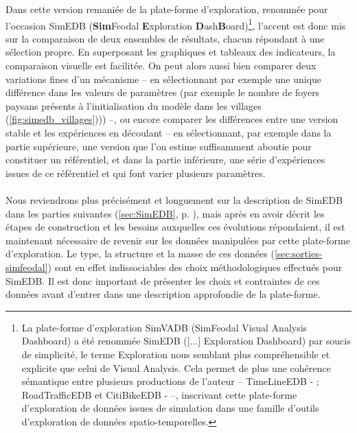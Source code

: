 	Dans cette version remaniée de la plate-forme d'exploration, renommée pour l'occasion SimEDB\label{par:introduction-nom-simedb} (\textbf{Sim}Feodal \textbf{E}xploration \textbf{D}ash\textbf{B}oard)\footnote{\label{ftn:origine-simedb}
		La plate-forme d'exploration SimVADB (SimFeodal Visual Analysis Dashboard) a été renommée SimEDB ([...] Exploration Dashboard) par soucis de simplicité, le terme \og Exploration\fg{} nous semblant plus compréhensible et explicite que celui de Visual Analysis. Cela permet de plus une cohérence sémantique entre plusieurs productions de l'auteur -- TimeLineEDB - \autocite{cura_timelineedb_2017}; RoadTrafficEDB et CitiBikeEDB - \autocite{cura_making_2017} --, inscrivant cette plate-forme d'exploration de données issues de simulation dans une \og famille \fg{} d'outils d'exploration de données spatio-temporelles.
	}, l'accent est donc mis sur la comparaison de deux ensembles de résultats, chacun répondant à une sélection propre.
	En superposant les graphiques et tableaux des indicateurs, la comparaison visuelle est facilitée.
	On peut alors aussi bien comparer deux variations fines d'un mécanisme -- en sélectionnant par exemple une unique différence dans les valeurs de paramètres (par exemple le nombre de foyers paysans présents à l'initialisation du modèle dans les villages (\cref{fig:simedb_villages}))) --, ou encore comparer les différences entre une version stable et les expériences en découlant -- en sélectionnant, par exemple dans la partie supérieure, une version que l'on estime suffisamment aboutie pour constituer un référentiel, et dans la partie inférieure, une série d'expériences issues de ce référentiel et qui font varier plusieurs paramètres.


	\paragraph*{}
	Nous reviendrons plus précisément et longuement sur la description de SimEDB dans les parties suivantes (\cref{sec:SimEDB}, p. \pageref{sec:SimEDB}), mais après en avoir décrit les étapes de construction et les besoins auxquelles ces évolutions répondaient, il est maintenant nécessaire de revenir sur les données manipulées par cette plate-forme d'exploration.
	Le type, la structure et la masse de ces données (\cref{sec:sorties-simfeodal}) sont en effet indissociables des choix méthodologiques effectués pour SimEDB.
	Il est donc important de présenter les choix et contraintes de ces données avant d'entrer dans une description approfondie de la plate-forme.

